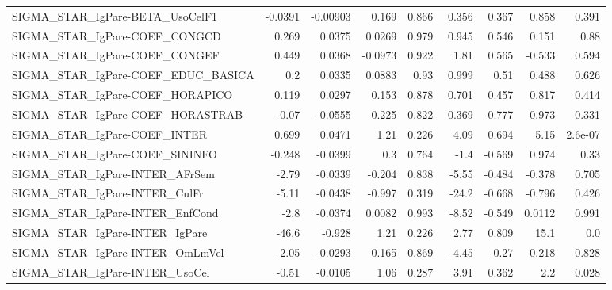 \begin{tabular}{lrrrrrrrr}
SIGMA\_STAR\_IgPare-BETA\_UsoCelF1       &     -0.0391 &     -0.00903 &    0.169 &    0.866 &      0.356 &       0.367 &        0.858 &         0.391 \\
SIGMA\_STAR\_IgPare-COEF\_CONGCD         &       0.269 &       0.0375 &   0.0269 &    0.979 &      0.945 &       0.546 &        0.151 &          0.88 \\
SIGMA\_STAR\_IgPare-COEF\_CONGEF         &       0.449 &       0.0368 &  -0.0973 &    0.922 &       1.81 &       0.565 &       -0.533 &         0.594 \\
SIGMA\_STAR\_IgPare-COEF\_EDUC\_BASICA    &         0.2 &       0.0335 &   0.0883 &     0.93 &      0.999 &        0.51 &        0.488 &         0.626 \\
SIGMA\_STAR\_IgPare-COEF\_HORAPICO       &       0.119 &       0.0297 &    0.153 &    0.878 &      0.701 &       0.457 &        0.817 &         0.414 \\
SIGMA\_STAR\_IgPare-COEF\_HORASTRAB      &       -0.07 &      -0.0555 &    0.225 &    0.822 &     -0.369 &      -0.777 &        0.973 &         0.331 \\
SIGMA\_STAR\_IgPare-COEF\_INTER          &       0.699 &       0.0471 &     1.21 &    0.226 &       4.09 &       0.694 &         5.15 &       2.6e-07 \\
SIGMA\_STAR\_IgPare-COEF\_SININFO        &      -0.248 &      -0.0399 &      0.3 &    0.764 &       -1.4 &      -0.569 &        0.974 &          0.33 \\
SIGMA\_STAR\_IgPare-INTER\_AFrSem        &       -2.79 &      -0.0339 &   -0.204 &    0.838 &      -5.55 &      -0.484 &       -0.378 &         0.705 \\
SIGMA\_STAR\_IgPare-INTER\_CulFr         &       -5.11 &      -0.0438 &   -0.997 &    0.319 &      -24.2 &      -0.668 &       -0.796 &         0.426 \\
SIGMA\_STAR\_IgPare-INTER\_EnfCond       &        -2.8 &      -0.0374 &   0.0082 &    0.993 &      -8.52 &      -0.549 &       0.0112 &         0.991 \\
SIGMA\_STAR\_IgPare-INTER\_IgPare        &       -46.6 &       -0.928 &     1.21 &    0.226 &       2.77 &       0.809 &         15.1 &           0.0 \\
SIGMA\_STAR\_IgPare-INTER\_OmLmVel       &       -2.05 &      -0.0293 &    0.165 &    0.869 &      -4.45 &       -0.27 &        0.218 &         0.828 \\
SIGMA\_STAR\_IgPare-INTER\_UsoCel        &       -0.51 &      -0.0105 &     1.06 &    0.287 &       3.91 &       0.362 &          2.2 &         0.028 \\

\end{tabular}
